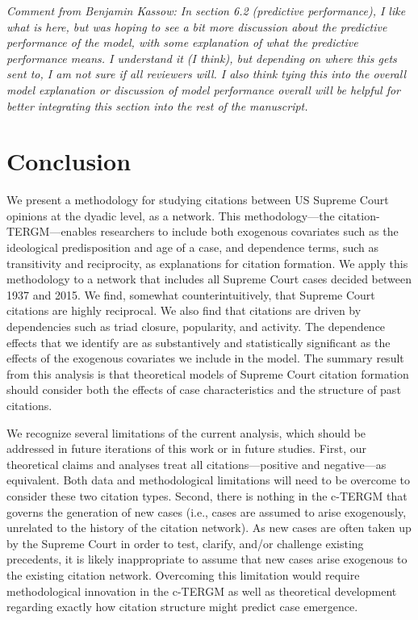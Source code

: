 \documentclass[headsepline=true, abstracton]{scrartcl}
\begin{document}
\textit{Comment from Benjamin Kassow: In section 6.2 (predictive performance), I like what is here, but was hoping to see a bit more discussion about the predictive 
performance of the model, with some explanation of what the predictive performance means. 
I understand it (I think), but depending on where this gets sent to, I am not sure if all reviewers will. 
I also think tying this into the overall model explanation or discussion of model performance overall will be helpful for better 
integrating this section into the rest of the manuscript.}

\section{Conclusion}

We present a methodology for studying citations between US Supreme Court opinions at the dyadic level, as a network. This methodology---the citation-TERGM---enables researchers to include both exogenous covariates such as the ideological predisposition and age of a case, and dependence terms, such as transitivity and reciprocity, as explanations for citation formation. We apply this methodology to a network that includes all Supreme Court cases decided between 1937 and 2015. We find, somewhat counterintuitively, that Supreme Court citations are highly reciprocal. We also find that citations are driven by dependencies such as triad closure, popularity, and activity. The dependence effects that we identify are as substantively and statistically significant as the effects of the exogenous covariates we include in the model. The summary result from this analysis is that theoretical models of Supreme Court citation formation should consider both the effects of case characteristics and the structure of past citations. 

We recognize several limitations of the current analysis, which should be addressed in future iterations of this work or in future studies. First, our theoretical claims and analyses treat all citations---positive and negative---as equivalent. Both data and methodological limitations will need to be overcome to consider these two citation types. Second, there is nothing in the c-TERGM that governs the generation of new cases (i.e., cases are assumed to arise exogenously, unrelated to the history of the citation network). As new cases are often taken up by the Supreme Court in order to test, clarify, and/or challenge existing precedents, it is likely inappropriate to assume that new cases arise exogenous to the existing citation network. Overcoming this limitation would require methodological innovation in the c-TERGM as well as theoretical development regarding exactly how citation structure might predict case emergence. 




 

\end{document}
